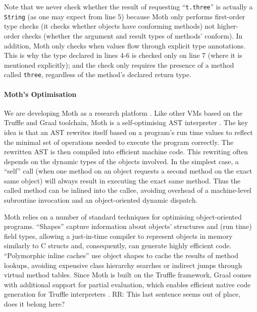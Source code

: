 \documentclass[sigplan,10pt,review,screen]{acmart}\settopmatter{printfolios=true}
\newcommand{\code}[1]{\texttt{#1}}
\newcommand{\RR}[1]{{\color{red}RR: #1}}
\begin{document}
Note that we never check
whether the result of requesting ``\code{t.three}'' is actually
a \code{String} (as one may expect from line 5) because Moth only performs first-order type checks
(it checks whether objects have conforming methods) not higher-order
checks (whether the argument and result types of methods' conform). In addition, Moth
only checks when values flow through explicit type annotations.
This is why the type declared in lines 4-6 is checked only on line 7
(where it is mentioned explicitly); and the check only requires the
presence of a method called \code{three}, regardless of the method's
declared return type.

\paragraph{Moth's Optimisation}
We are developing Moth as a
research platform \cite{roberts-and-co-ecoop-2019}. Like other VMs
based on the Truffle and Graal toolchain, Moth is a self-optimising
AST interpreter \cite{Wurthinger:2012:SelfOptAST}. 
The key idea is that an AST rewrites itself based on a program's run time values
to reflect the minimal set of operations needed to execute the program
correctly. The rewritten AST is then compiled into efficient machine
code. This rewriting often depends on the dynamic types of the
objects involved. In the simplest case, a ``self'' call (when one method
on an object requests a second method on the exact same object) will
always result in executing the exact same method. Thus the called method can be inlined into
the callee, avoiding overhead of a machine-level subroutine
invocation and an object-oriented dynamic dispatch.


Moth relies on a number of standard techniques for optimising
object-oriented programs.
``Shapes'' \citep{woss2014object} capture information about objects'
structures and (run time) 
field types, allowing a just-in-time compiler to
represent objects in memory similarly to C structs and, consequently,
can generate highly efficient code.
``Polymorphic inline caches''
\citep{Hoelzle:91:PIC} use object shapes to cache the results of
method lookups, avoiding expensive class hierarchy searches or
indirect jumps through virtual method tables. 
Since Moth is built on the Truffle framework,
Graal comes with  additional support for partial evaluation,
which enables efficient native code generation for
Truffle interpreters \citep{Wurthinger:2017:PPE}.
\RR{This last sentence seems out of place, does it belong here?}
\end{document}
